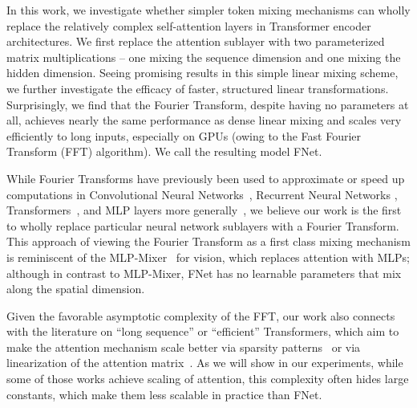 \documentclass[11pt]{article}
\renewcommand{\O}[1]{}
\begin{document}
In this work, we investigate whether simpler token mixing mechanisms can wholly replace the relatively complex self-attention layers in Transformer encoder architectures. We first replace the attention sublayer with two parameterized matrix multiplications -- one mixing the sequence dimension and one mixing the hidden dimension. Seeing promising results in this simple linear mixing scheme, we further investigate the efficacy of faster, structured linear transformations. Surprisingly, we find that the Fourier Transform, despite having no parameters at all, achieves nearly the same performance as dense linear mixing and scales very efficiently to long inputs, especially on GPUs (owing to the \O{N \log N} Fast Fourier Transform (FFT) algorithm). We call the resulting model FNet. 

While Fourier Transforms have previously been used to approximate or speed up computations in Convolutional Neural Networks~\citep{el2004fast, mathieu2014fast, highlander2016very, pratt2017fcnn, lin2018fft, chitsaz2020acceleration, goldberg2020rethinking}, Recurrent Neural Networks \citep{koplon1997using, zhang2000forenet, zhang2018learning},  Transformers~\citep{choromanski2020masked, tamkin2020language}, and MLP layers more generally~\citep{cheng2015exploration, moczulski2015acdc, sindhwani2015structured}, we believe our work is the first to wholly replace particular neural network sublayers with a Fourier Transform. This approach of viewing the Fourier Transform as a first class mixing mechanism is reminiscent of the MLP-Mixer~\citep{tolstikhin2021mlp} for vision, which replaces attention with MLPs; although in contrast to MLP-Mixer, FNet has no learnable parameters that mix along the spatial dimension.

Given the favorable asymptotic complexity of the FFT, our work also connects with the literature on ``long sequence'' or ``efficient'' Transformers, which aim to make the attention mechanism scale better via sparsity patterns~\citep{child2019generating, qiu2019blockwise, parmar2018image, beltagy2020longformer, ainslie2020etc, zaheer2020big, wang2020linformer, tay2020sparse, tay2020synthesizer, kitaev2020reformer, roy2021efficient, vyas2020fast, liu2018generating} or via linearization of the attention matrix~\citep{katharopoulos2020transformers, choromanski2020rethinking, peng2021random}. As we will show in our experiments, while some of those works achieve  scaling of attention, this complexity often hides large constants, which make them less scalable in practice than FNet.
\end{document}
